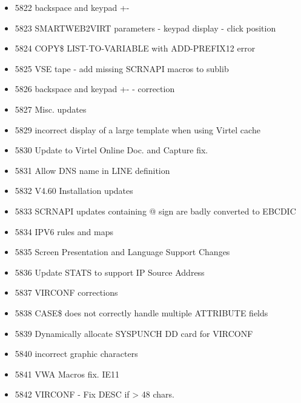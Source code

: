 \documentclass[letterpaper,10pt,english]{sphinxmanual}
\begin{document}
\begin{itemize}
\item {} 
5822 backspace and keypad +-

\item {} 
5823 SMARTWEB2VIRT parameters - keypad display - click position

\item {} 
5824 COPY\$ LIST-TO-VARIABLE with ADD-PREFIX12 error

\item {} 
5825 VSE tape - add missing SCRNAPI macros to sublib

\item {} 
5826 backspace and keypad +- - correction

\item {} 
5827 Misc. updates

\item {} 
5829 incorrect display of a large template when using Virtel cache

\item {} 
5830 Update to Virtel Online Doc. and Capture fix.

\item {} 
5831 Allow DNS name in LINE definition

\item {} 
5832 V4.60 Installation updates

\item {} 
5833 SCRNAPI updates containing @ sign are badly converted to EBCDIC

\item {} 
5834 IPV6 rules and maps

\item {} 
5835 Screen Presentation and Language Support Changes

\item {} 
5836 Update STATS to support IP Source Address

\item {} 
5837 VIRCONF corrections

\item {} 
5838 CASE\$ does not correctly handle multiple ATTRIBUTE fields

\item {} 
5839 Dynamically allocate SYSPUNCH DD card for VIRCONF

\item {} 
5840 incorrect graphic characters

\item {} 
5841 VWA Macros fix. IE11

\item {} 
5842 VIRCONF - Fix DESC if \textgreater{} 48 chars.


\end{itemize}
\end{document}
